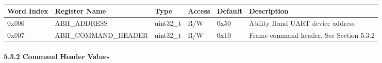 \documentclass[
  11pt,
]{article}
\newcounter{none} %
\begin{document}
{\def\LTcaptype{none} %
\begin{longtable}[]{@{}
  >{\raggedright\arraybackslash}p{}
  >{\raggedright\arraybackslash}p{}
  >{\raggedright\arraybackslash}p{}
  >{\raggedright\arraybackslash}p{}
  >{\raggedright\arraybackslash}p{}
  >{\raggedright\arraybackslash}p{}@{}}
\toprule\noalign{}
\begin{minipage}[b]{\linewidth}\raggedright
Word Index
\end{minipage} & \begin{minipage}[b]{\linewidth}\raggedright
Register Name
\end{minipage} & \begin{minipage}[b]{\linewidth}\raggedright
Type
\end{minipage} & \begin{minipage}[b]{\linewidth}\raggedright
Access
\end{minipage} & \begin{minipage}[b]{\linewidth}\raggedright
Default
\end{minipage} & \begin{minipage}[b]{\linewidth}\raggedright
Description
\end{minipage} \\
\midrule\noalign{}
\endhead
\bottomrule\noalign{}
\endlastfoot
0x006 & ABH\_ADDRESS & uint32\_t & R/W & 0x50 & Ability Hand UART device
address \\
0x007 & ABH\_COMMAND\_HEADER & uint32\_t & R/W & 0x10 & Frame command
header. See Section 5.3.2 \\
\end{longtable}
}

\paragraph{5.3.2 Command Header Values}\label{command-header-values}
\end{document}
